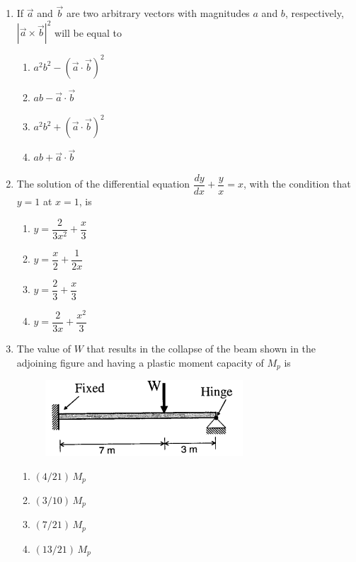 \documentclass[journal,12pt,onecolumn]{IEEEtran}
\theoremstyle{remark}
\begin{document}
\begin{enumerate}
\item If $\vec{a}$ and $\vec{b}$ are two arbitrary vectors with magnitudes $a$ and $b$, respectively, $|\vec{a} \times \vec{b}|^2$ will be equal to

\hfill{}
\begin{enumerate}
\item $a^2 b^2 - \left(\vec{a} \cdot \vec{b}\right)^2$
\item $ab - \vec{a} \cdot \vec{b}$
\item $a^2 b^2 + \left(\vec{a} \cdot \vec{b}\right)^2$
\item $ab + \vec{a} \cdot \vec{b}$
\end{enumerate}

\item The solution of the differential equation $\dfrac{dy}{dx} + \dfrac{y}{x} = x$, with the condition that $y = 1$ at $x = 1$, is

\hfill{}
\begin{enumerate}
\item $y = \dfrac{2}{3x^2} + \dfrac{x}{3}$
\item $y = \dfrac{x}{2} + \dfrac{1}{2x}$
\item $y = \dfrac{2}{3} + \dfrac{x}{3}$
\item $y = \dfrac{2}{3x} + \dfrac{x^2}{3}$
\end{enumerate}

\item The value of $W$ that results in the collapse of the beam shown in the adjoining figure and having a plastic moment capacity of $M_p$ is

\hfill{}
\begin{figure}[H]
\centering
\includegraphics[width=0.4\columnwidth]{figs/q31.png}
\caption*{}
\label{fig:Q.31}
\end{figure}
\begin{enumerate}
\item $(4/21)\, M_p$
\item $(3/10)\, M_p$
\item $(7/21)\, M_p$
\item $(13/21)\, M_p$
\end{enumerate}


\end{enumerate}
\end{document}
